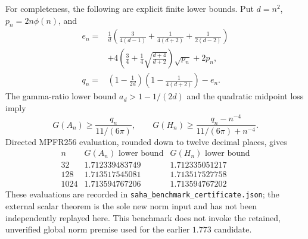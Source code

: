 For completeness, the following are explicit finite lower bounds.
Put $d=n^2$, $p_n=2n\phi(n)$, and
\begin{align*}
 e_n={}&\frac1d\left(\frac{3}{4(d-1)}+
             \frac1{4(d+2)}+\frac1{2(d-2)}\right)\\
 &+4\left(\frac34+\frac14\sqrt{\frac{d+4}{d+2}}\right)
       \sqrt{p_n}+2p_n,\\
 q_n={}&\left(1-\frac1{2d}\right)
             \left(1-\frac1{4(d+2)}\right)-e_n.
\end{align*}
The gamma-ratio lower bound $a_d>1-1/(2d)$ and the quadratic
midpoint loss imply
\[
 G(A_n)\geq\frac{q_n}{11/(6\pi)},\qquad
 G(H_n)\geq\frac{q_n-n^{-4}}{11/(6\pi)+n^{-4}}.
\]
Directed MPFR256 evaluation, rounded down to twelve decimal places,
gives
\[
\begin{array}{c|cc}
 n & G(A_n)\text{ lower bound} & G(H_n)\text{ lower bound}\\\hline
 32&1.712339483749&1.712335051217\\
 128&1.713517545081&1.713517527758\\
 1024&1.713594767206&1.713594767202
\end{array}
\]
These evaluations are recorded in
\texttt{saha\_benchmark\_certificate.json}; the external scalar
theorem is the sole new norm input and has not been independently
replayed here.  This benchmark does not invoke the retained, unverified
global norm premise used for the earlier $1.773$ candidate.
